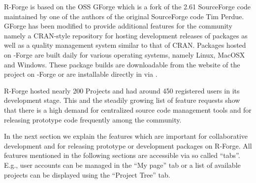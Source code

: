 R-Forge is based on the OSS GForge \citep{forge:copeland_et_al:2006} which is a
fork of the 2.61 SourceForge code maintained by one of the authors of
the original SourceForge code Tim Perdue. GForge has been modified to
provide additional features for the \R{} community namely a
CRAN-style repository for hosting development releases of \R{}
packages as well as a quality management system similar to that of
CRAN.
Packages hosted on \R{}-Forge are built daily
for various operating systems, namely Linux, MacOSX and Windows. These
package builds are downloadable from the website of the project on
\R{}-Forge or are installable directly in \R{} via
.





R-Forge hosted nearly 200 Projects and had around 450
registered users in its development stage. This and the steadily growing list of
feature requests show that there is a high demand for centralized source code
management tools and for releasing prototype code frequently among the
\R{} community.

In the next section we explain the features which are important for
collaborative development and for releasing prototype or development
packages on R-Forge.
All features mentioned in the following sections are accessible via so called
``tabs''. E.g., user accounts can be managed in the ``My page'' tab or
a list of available projects can be displayed using the ``Project Tree'' tab. 


